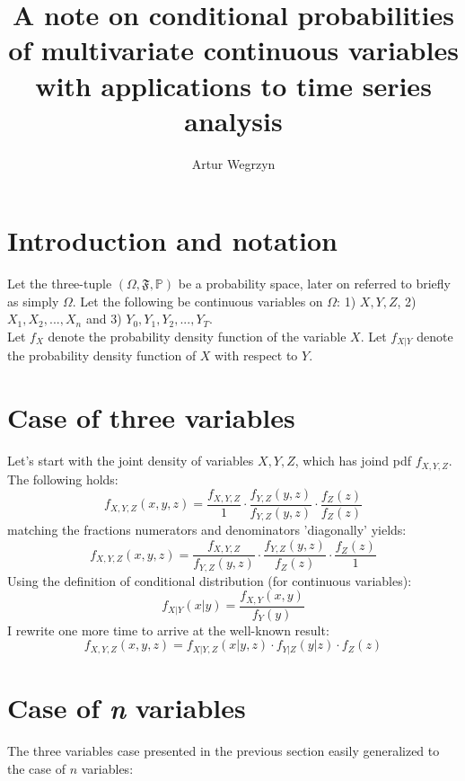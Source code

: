 \documentclass[12pt]{article}
\begin{document}
\title{A note on conditional probabilities of multivariate continuous variables with applications to time series analysis}
\author{Artur Wegrzyn}
\maketitle



\section{Introduction and notation}
Let the three-tuple $(\Omega, \mathfrak{F}, \mathbb{P})$ be a probability space, later on
 referred to briefly as simply $\Omega$. Let the following be continuous variables on 
 $\Omega$: 1) $X, Y, Z$, 2) $X_1, X_2, ..., X_n$ and 3) $Y_0, Y_1, Y_2, ..., Y_T$. \\
Let $f_X$ denote the probability density function of the variable $X$. 
Let $f_{X|Y}$ denote the probability density function of $X$ with respect to $Y$.

\section{Case of three variables}
Let's start with the joint density of variables $X, Y, Z$, which has joind pdf 
$f_{X, Y, Z}$. The following holds:
\begin{equation*}
f_{X, Y, Z}(x,y,z) = \frac{f_{X, Y, Z}}{1} \cdot 
\frac{f_{Y, Z}(y,z)}{f_{Y, Z}(y,z)} \cdot
\frac{f_{Z}(z)}{f_{Z}(z)}
\end{equation*}
matching the fractions numerators and denominators 'diagonally' yields:
\begin{equation*}
f_{X, Y, Z}(x,y,z) = \frac{f_{X, Y, Z}}{f_{Y, Z}(y,z)} \cdot 
\frac{f_{Y, Z}(y,z)}{f_{Z}(z)} \cdot
\frac{f_{Z}(z)}{1}
\end{equation*}
Using the definition of conditional distribution (for continuous variables):
$$ 
f_{X|Y}(x|y) = \frac{f_{X, Y}(x, y)}{f_Y(y)}
$$
I rewrite one more time to arrive at the well-known result:
\begin{equation*}
f_{X, Y, Z}(x, y, z) = 
f_{X|Y, Z}(x|y, z) \cdot f_{Y|Z}(y|z) \cdot f_Z(z)
\end{equation*}

\section{Case of \textit{n} variables}
The three variables case presented in the previous section easily generalized to the case 
of $n$ variables:
\end{document}
